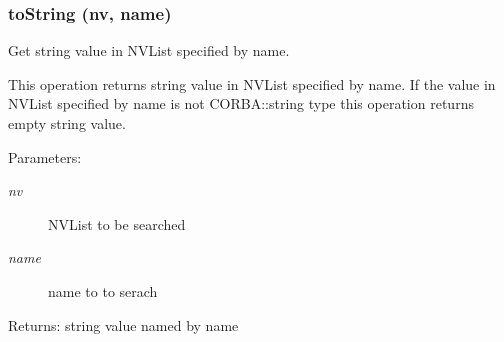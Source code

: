 \subsubsection{\setlength{\rightskip}{0pt plus 5cm}to\-String (nv, name)}\label{NVUtil_8py_a11}


Get string value in NVList specified by name. 

This operation returns string value in NVList specified by name. If the value in NVList specified by name is not CORBA::string type this operation returns empty string value.

\begin{Desc}
\item[Parameters:]
\begin{description}
\item[{\em nv}]NVList to be searched \item[{\em name}]name to to serach \end{description}
\end{Desc}
\begin{Desc}
\item[Returns:]string value named by name\end{Desc}
